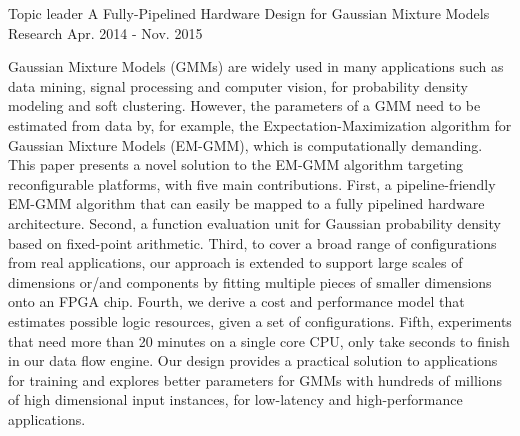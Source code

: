 \documentclass[11pt, a4paper]{awesome-cv}
\begin{document}
\begin{cventries}
  \cventry
    {Topic leader} %
    {A Fully-Pipelined Hardware Design for Gaussian Mixture Models} %
    {Research} %
    {Apr. 2014 - Nov. 2015} %
    {
      \begin{cvitems} %
        \item {Gaussian Mixture Models (GMMs) are widely used in many applications such as data mining, signal processing and computer vision, for probability density modeling and soft clustering. However, the parameters of a GMM need to be estimated from data by, for example, the Expectation-Maximization algorithm for Gaussian Mixture Models (EM-GMM), which is computationally demanding. This paper presents a novel solution to the EM-GMM algorithm targeting reconfigurable platforms, with five main contributions.  First, a pipeline-friendly EM-GMM algorithm that can easily be mapped to a fully pipelined hardware architecture. Second, a function evaluation unit for Gaussian probability density based on fixed-point arithmetic. Third, to cover a broad range of configurations from real applications, our approach is extended to support large scales of dimensions or/and components by fitting multiple pieces of smaller dimensions onto an FPGA chip. Fourth, we derive a cost and performance model that estimates possible logic resources, given a set of configurations. Fifth, experiments that need more than 20 minutes on a single core CPU, only take seconds to finish in our data flow engine.  Our design provides a practical solution to applications for training and explores better parameters for GMMs with hundreds of millions of high dimensional input instances, for low-latency and high-performance applications.}
      \end{cvitems}
    }


\end{cventries}
\end{document}
